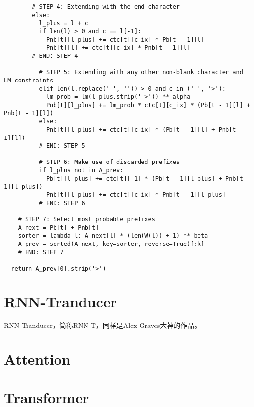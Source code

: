 {{\begin{lstlisting}
        # STEP 4: Extending with the end character
        else:
          l_plus = l + c
          if len(l) > 0 and c == l[-1]:
            Pnb[t][l_plus] += ctc[t][c_ix] * Pb[t - 1][l]
            Pnb[t][l] += ctc[t][c_ix] * Pnb[t - 1][l]
        # END: STEP 4

          # STEP 5: Extending with any other non-blank character and LM constraints
          elif len(l.replace(' ', '')) > 0 and c in (' ', '>'):
            lm_prob = lm(l_plus.strip(' >')) ** alpha
            Pnb[t][l_plus] += lm_prob * ctc[t][c_ix] * (Pb[t - 1][l] + Pnb[t - 1][l])
          else:
            Pnb[t][l_plus] += ctc[t][c_ix] * (Pb[t - 1][l] + Pnb[t - 1][l])
          # END: STEP 5

          # STEP 6: Make use of discarded prefixes
          if l_plus not in A_prev:
            Pb[t][l_plus] += ctc[t][-1] * (Pb[t - 1][l_plus] + Pnb[t - 1][l_plus])
            Pnb[t][l_plus] += ctc[t][c_ix] * Pnb[t - 1][l_plus]
          # END: STEP 6

    # STEP 7: Select most probable prefixes
    A_next = Pb[t] + Pnb[t]
    sorter = lambda l: A_next[l] * (len(W(l)) + 1) ** beta
    A_prev = sorted(A_next, key=sorter, reverse=True)[:k]
    # END: STEP 7

  return A_prev[0].strip('>')

\end{lstlisting}

\section{RNN-Tranducer}
RNN-Tranducer，简称RNN-T，同样是Alex Graves大神的作品。
\section{Attention}

\section{Transformer}


}}
